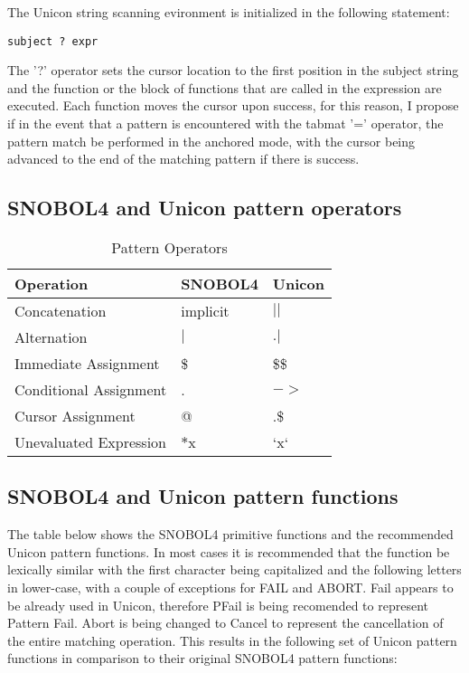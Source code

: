\documentclass{article}
\begin{document}
The Unicon string scanning evironment is initialized in the following statement:

\begin{verbatim}
subject ? expr
\end{verbatim}

The '?' operator sets the cursor location to the first position in the subject string and the function or the block of functions that are called in the expression are executed.  Each function moves the cursor upon success, for this reason, I propose if in the event that a pattern is encountered with the tabmat '=' operator, the pattern match be performed in the anchored mode, with the cursor being advanced to the end of the matching pattern if there is success.

\subsection{SNOBOL4 and Unicon pattern operators}



\begin{table}[ht]
	\caption{Pattern Operators}
	\centering
	\begin{tabular}{|l|l|l|}
		\hline\hline
		Operation & SNOBOL4 & Unicon \\
		\hline
		Concatenation & implicit & $||$ \\
		Alternation & $|$ & $.|$ \\
		Immediate Assignment & \$ & \$\$ \\
		Conditional Assignment & . & $->$ \\
		Cursor Assignment & @ & .\$ \\
		Unevaluated Expression & $*$x & `x` \\
		\hline
	\end{tabular}
\end{table}

\subsection{SNOBOL4 and Unicon pattern functions}

The table below shows the SNOBOL4 primitive functions and the recommended Unicon pattern functions.  In most cases it is recommended that the function be lexically similar with the first character being capitalized and the following letters in lower-case, with a couple of exceptions for FAIL and ABORT.  Fail appears to be already used in Unicon, therefore PFail is being recomended to represent Pattern Fail.  Abort is being changed to Cancel to represent the cancellation of the entire matching operation.  This results in the following set of Unicon pattern functions in comparison to their original SNOBOL4 pattern functions:
\end{document}
